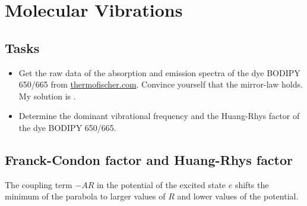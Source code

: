 \renewcommand{\chapterauthors}{Markus Lippitz}
\renewcommand{\lastmod}{April 26, 2024}


\chapter{Molecular Vibrations}



\section{Tasks}

\begin{itemize}
\item Get  the raw data of the absorption and emission spectra of the dye BODIPY 650/665 from \href{https://www.thermofisher.com/de/de/home/life-science/cell-analysis/labeling-chemistry/fluorescence-spectraviewer.html?SID=srch-svtool&UID=10001moh}{thermofischer.com}.
 Convince yourself that the mirror-law holds. My solution is .




\item Determine the dominant vibrational frequency and the Huang-Rhys factor of the dye BODIPY 650/665.

\end{itemize}



\section{Franck-Condon factor and Huang-Rhys factor}

\begin{marginfigure}
\caption{The coupling term $-A R$ in the potential of the excited state $e$ shifts the minimum of the parabola to larger values of $R$ and lower values of the potential. \label{fig:vib_parabola}}
\end{marginfigure}



